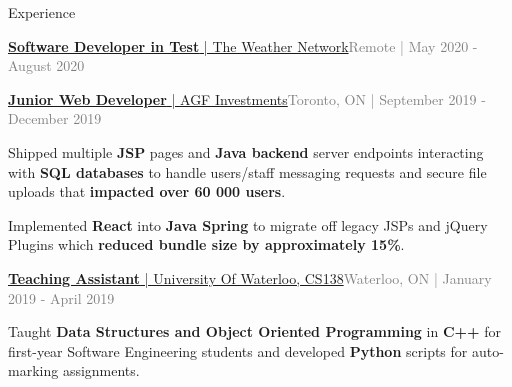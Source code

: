 \documentclass[hidelinks]{resume} %
\begin{document}
\begin{rSection}{Experience}
\begin{rSubsection}{\href{https://www.theweathernetwork.com/}{\textbf{Software Developer in Test}{ | The Weather Network}}}{\textcolor{gray}{Remote | May 2020 - August 2020}}{}
\begin{bulletpoints}
             \vspace{-.25cm}
        \end{bulletpoints}
\end{rSubsection}
\begin{rSubsection}{\href{https://www.agf.com/ca/en/index.jsp}{\textbf{Junior Web Developer} {| AGF Investments}}}{\textcolor{gray}{Toronto, ON | September 2019 - December 2019}}{}
        \par
        \begin{bulletpoints}
            \vspace{-.10cm}
            \item Shipped multiple \textbf{JSP} pages and \textbf{Java backend} server endpoints interacting with \textbf{SQL databases} to handle users/staff messaging requests and secure file uploads that \textbf{impacted over 60 000 users}.
            \vspace{-.13cm}
             \item Implemented \textbf{React} into \textbf{Java Spring} to migrate off legacy JSPs and jQuery Plugins which \textbf{reduced bundle size by approximately 15\%}.
             \vspace{-.25cm}
        \end{bulletpoints}
\end{rSubsection}
\begin{rSubsection}{\href{https://student.cs.uwaterloo.ca/~cs138/outline.shtml}{\textbf{Teaching Assistant}{ | University Of Waterloo, CS138}}}{\textcolor{gray}{Waterloo, ON | January 2019 - April 2019}}{}

    \begin{bulletpoints}
        \vspace{-.10cm}
        \item Taught \textbf{Data Structures and Object Oriented Programming} in \textbf{C++} for first-year Software Engineering students and developed \textbf{Python} scripts for auto-marking assignments.
        \vspace{-.25cm}
    \end{bulletpoints}   

\end{rSubsection}

\end{rSection}

\vspace{-.05cm}
\end{document}
